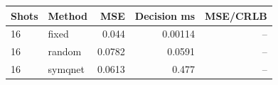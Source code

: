 \begin{tabular}{llrrr}
\toprule
Shots & Method & MSE & Decision ms & MSE/CRLB \\
\midrule
16 & fixed & 0.044 & 0.00114 & -- \\
16 & random & 0.0782 & 0.0591 & -- \\
16 & symqnet & 0.0613 & 0.477 & -- \\
\bottomrule
\end{tabular}
